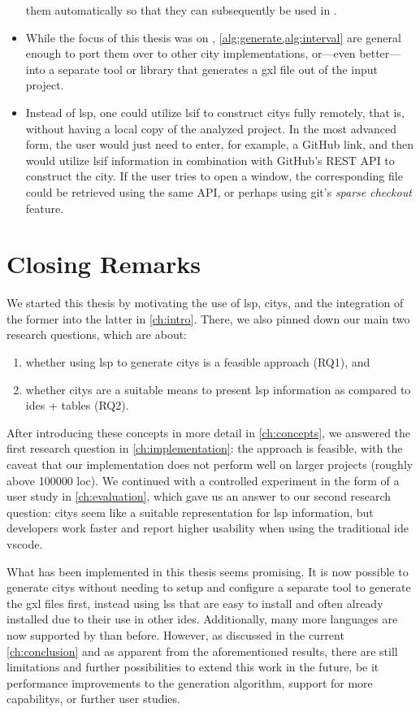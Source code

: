 \documentclass[../thesis]{subfiles}
\begin{document}
\begin{itemize}
{	      } them automatically so that they can subsequently be used in \SEE{}.
	\item While the focus of this thesis was on \SEE{}, \cref{alg:generate,alg:interval} are general enough to port them over to other \gls{city} implementations, or---even better---into a separate tool or library that generates a \gls{gxl} file out of the input project.
	\item Instead of \gls{lsp}, one could utilize \gls{lsif} to construct \glspl{city} fully remotely, that is, without having a local copy of the analyzed project.
	      In the most advanced form, the user would just need to enter, for example, a GitHub link, and then \SEE{} would utilize \gls{lsif} information in combination with GitHub's REST API to construct the city.
	      If the user tries to open a \gls{window}, the corresponding file could be retrieved using the same API, or perhaps using git's \emph{sparse checkout} feature.
\end{itemize}

\section{Closing Remarks}
We started this thesis by motivating the use of \gls{lsp}, \glspl{city}, and the integration of the former into the latter in \cref{ch:intro}.
There, we also pinned down our main two research questions, which are about:
\begin{enumerate}
	\item whether using \gls{lsp} to generate \glspl{city} is a feasible approach (\textsf{RQ1}), and
	\item whether \glspl{city} are a suitable means to present \gls{lsp} information as compared to \glspl{ide} + tables (\textsf{RQ2}).
\end{enumerate}
After introducing these concepts in more detail in \cref{ch:concepts}, we answered the first research question in \cref{ch:implementation}: the approach is feasible, with the caveat that our implementation does not perform well on larger projects (roughly above \num{100000} \gls{loc}).
We continued with a controlled experiment in the form of a user study in \cref{ch:evaluation}, which gave us an answer to our second research question:
\glspl{city} seem like a suitable representation for \gls{lsp} information, but developers work faster and report higher usability when using the traditional \gls{ide} \gls{vscode}.

What has been implemented in this thesis seems promising.
It is now possible to generate \glspl{city} without needing to setup and configure a separate tool to generate the \gls{gxl} files first, instead using \glspl{ls} that are easy to install and often already installed due to their use in other \glspl{ide}.
Additionally, many more languages are now supported by \SEE{} than before.
However, as discussed in the current \cref{ch:conclusion} and as apparent from the aforementioned results, there are still limitations and further possibilities to extend this work in the future, be it performance improvements to the generation algorithm, support for more \glspl{capability}, or further user studies.

\end{document}
